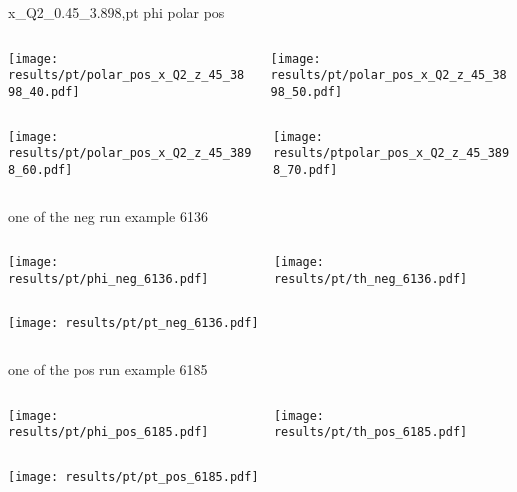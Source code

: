 \begin{frame}{x\_Q2\_0.45\_3.898,pt phi polar pos}
\begin{columns}
\begin{column}[T]{0.5\textwidth}
\texttt{[image: results/pt/polar\_pos\_x\_Q2\_z\_45\_3898\_40.pdf]}
\end{column}
\begin{column}[T]{0.5\textwidth}
\texttt{[image: results/pt/polar\_pos\_x\_Q2\_z\_45\_3898\_50.pdf]}
\end{column}
\end{columns}
\begin{columns}
\begin{column}[T]{0.5\textwidth}
\texttt{[image: results/pt/polar\_pos\_x\_Q2\_z\_45\_3898\_60.pdf]}
\end{column}
\begin{column}[T]{0.5\textwidth}
\texttt{[image: results/ptpolar\_pos\_x\_Q2\_z\_45\_3898\_70.pdf]}
\end{column}
\end{columns}
\end{frame}
\begin{frame}{one of the neg run example 6136}
\begin{columns}
\begin{column}[T]{0.5\textwidth}
\texttt{[image: results/pt/phi\_neg\_6136.pdf]}
\end{column}
\begin{column}[T]{0.5\textwidth}
\texttt{[image: results/pt/th\_neg\_6136.pdf]}
\end{column}
\end{columns}
\begin{columns}
\begin{column}[T]{0.5\textwidth}
\texttt{[image: results/pt/pt\_neg\_6136.pdf]}
\end{column}
\begin{column}[T]{0.5\textwidth}
\end{column}
\end{columns}
\end{frame}
\begin{frame}{one of the pos run example 6185}
\begin{columns}
\begin{column}[T]{0.5\textwidth}
\texttt{[image: results/pt/phi\_pos\_6185.pdf]}
\end{column}
\begin{column}[T]{0.5\textwidth}
\texttt{[image: results/pt/th\_pos\_6185.pdf]}
\end{column}
\end{columns}
\begin{columns}
\begin{column}[T]{0.5\textwidth}
\texttt{[image: results/pt/pt\_pos\_6185.pdf]}
\end{column}
\begin{column}[T]{0.5\textwidth}
\end{column}
\end{columns}
\end{frame}
